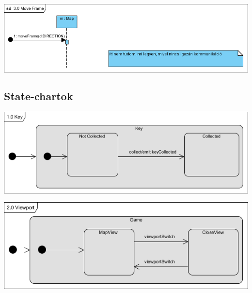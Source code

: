 		\begin{center}
			\includegraphics[scale=0.8]{resources/seq_3-0_moveFrame.png}
		\end{center}
	
	\subsection{State-chartok}
	
		\begin{center}
			\includegraphics[scale=0.8]{resources/state_1-0_key.png}
		\end{center}
	
		\begin{center}
			\includegraphics[scale=0.8]{resources/state_2-0_viewport.png}
		\end{center}
	
